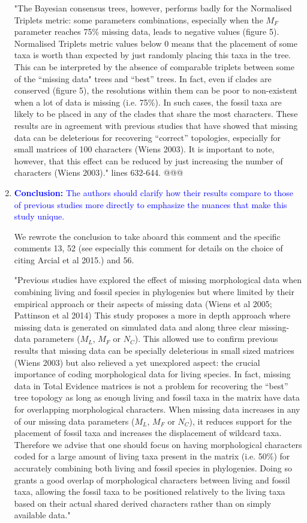 \documentclass[12pt,letterpaper]{article}
\begin{document}
\begin{enumerate}
"The Bayesian consensus trees, however, performs badly for the Normalised Triplets metric: some parameters combinations, especially when the $M_F$ parameter reaches 75\% missing data, leads to negative values (figure 5).
Normalised Triplets metric values below 0 means that the placement of some taxa is worth than expected by just randomly placing this taxa in the tree.
This can be interpreted by the absence of comparable triplets between some of the ``missing data" trees and ``best'' trees.
In fact, even if clades are conserved (figure 5), the resolutions within them can be poor to non-existent when a lot of data is missing (i.e. 75\%).
In such cases, the fossil taxa are likely to be placed in any of the clades that share the most characters.
These results are in agreement with previous studies that have showed that missing data can be deleterious for recovering ``correct'' topologies, especially for small matrices of 100 characters (Wiens 2003).
It is important to note, however, that this effect can be reduced by just increasing the number of characters (Wiens 2003)." lines 632-644. @@@



\item{\textcolor{blue}{\textbf{Conclusion:} The authors should clarify how their results compare to those of previous studies more directly to emphasize the nuances that make this study unique. }}

We rewrote the conclusion to take aboard this comment and the specific comments 13, 52 (see especially this comment for details on the choice of citing Arcial et al 2015.) and 56.

"Previous studies have explored the effect of missing morphological data when combining living and fossil species in phylogenies but where limited by their empirical approach or their aspects of missing data (Wiens et al 2005; Pattinson et al 2014)
This study proposes a more in depth approach where missing data is generated on simulated data and along three clear missing-data parameters ($M_{L}$, $M_{F}$ or $N_{C}$).
This allowed use to confirm previous results that missing data can be specially deleterious in small sized matrices (Wiens 2003) but also relieved a yet unexplored aspect: the crucial importance of coding morphological data for living species.
In fact, missing data in Total Evidence matrices is not a problem for recovering the ``best'' tree topology as long as enough living and fossil taxa in the matrix have data for overlapping morphological characters.
When missing data increases in any of our missing data parameters ($M_{L}$, $M_{F}$ or $N_{C}$), it reduces support for the placement of fossil taxa and increases the displacement of wildcard taxa.
Therefore we advise that one should focus on having morphological characters coded for a large amount of living taxa present in the matrix (i.e. 50\%) for accurately combining both living and fossil species in phylogenies.
Doing so grants a good overlap of morphological characters between living and fossil taxa, allowing the fossil taxa to be positioned relatively to the living taxa based on their actual shared derived characters rather than on simply available data."


\end{enumerate}
\end{document}
